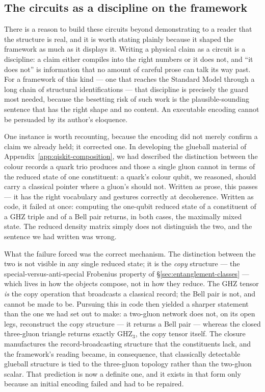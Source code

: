 \subsection{The circuits as a discipline on the framework}

There is a reason to build these circuits beyond demonstrating to a reader that the structure is
real, and it is worth stating plainly because it shaped the framework as much as it displays it.
Writing a physical claim as a circuit is a discipline: a claim either compiles into the right
numbers or it does not, and ``it does not'' is information that no amount of careful prose can talk
its way past. For a framework of this kind --- one that reaches the Standard Model through a long
chain of structural identifications --- that discipline is precisely the guard most needed, because
the besetting risk of such work is the plausible-sounding sentence that has the right shape and no
content. An executable encoding cannot be persuaded by its author's eloquence.

One instance is worth recounting, because the encoding did not merely confirm a claim we already
held; it corrected one. In developing the glueball material of Appendix~\ref{app:qiskit-composition},
we had described the distinction between the colour records a quark trio produces and those a single
gluon cannot in terms of the reduced state of one constituent: a quark's colour qubit, we reasoned,
should carry a classical pointer where a gluon's should not. Written as prose, this passes --- it
has the right vocabulary and gestures correctly at decoherence. Written as code, it failed at once:
computing the one-qubit reduced state of a constituent of a GHZ triple and of a Bell pair returns,
in both cases, the maximally mixed state. The reduced density matrix simply does not distinguish the
two, and the sentence we had written was wrong.

What the failure forced was the correct mechanism. The distinction between the two is not visible in
any single reduced state; it is the \emph{copy} structure --- the special-versus-anti-special
Frobenius property of \S\ref{sec:entanglement-classes} --- which lives in how the objects compose,
not in how they reduce. The GHZ tensor \emph{is} the copy operation that broadcasts a classical
record; the Bell pair is not, and cannot be made to be. Pursuing this in code then yielded a sharper
statement than the one we had set out to make: a two-gluon network does not, on its open legs,
reconstruct the copy structure --- it returns a Bell pair --- whereas the closed three-gluon
triangle returns exactly $\mathrm{GHZ}_3$, the copy tensor itself. The closure manufactures the
record-broadcasting structure that the constituents lack, and the framework's reading became, in
consequence, that classically detectable glueball structure is tied to the three-gluon topology
rather than the two-gluon scalar. That prediction is now a definite one, and it exists in that form
only because an initial encoding failed and had to be repaired.

